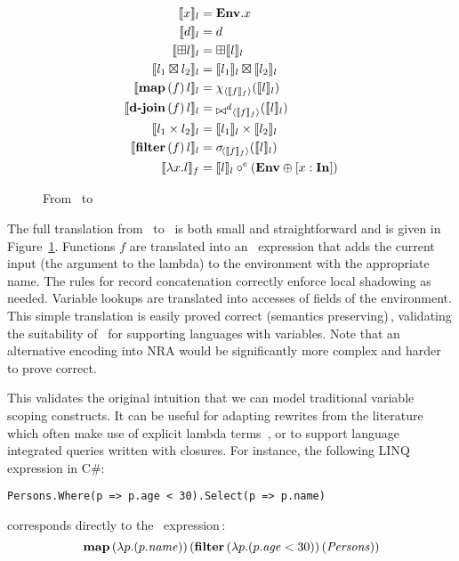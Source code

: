 \begin{figure}[thb]
  \centering
\begin{align*}
\ltoe{x}&=\qENV.x\\
\ltoe{d}&=d\\
\ltoe{\opunop l}&=\opunop{\ltoe{l}}\\
\ltoe{l_1 \opbinop l_2}&=\ltoe{l_1}\opbinop \ltoe{l_2}\\
\ltoe{\lmap{f}{l}}&=\qmap{\ftoe{f}}{\ltoe{l}}\\
\ltoe{\ldjoin{f}{l}}&=\qdjoin{\ftoe{f}}{\ltoe{l}}\\
\ltoe{l_1\times l_2}&=\ltoe{l_1}\times\ltoe{l_2}\\
\ltoe{\lsel{f}{l}}&=\qselect{\ftoe{f}}{\ltoe{l}}\\
\ftoe{\lambda x. l}&=\ltoe{l}\circ^{e}\left(\qENV\opconcat \mbox{[}x : \qID\mbox{]}\right)
\end{align*}
\caption{From \NRALambda\ to
    \NRAEnv\, 
    }
  \label{fig:nralambda-tonraenv}
\end{figure}

The full translation from \NRALambda\ to \NRAEnv\ is both small and
straightforward and is given in Figure~\ref{fig:nralambda-tonraenv}.
Functions $f$ are translated into an \NRAEnv\ expression that adds the
current input (the argument to the lambda) to the environment with the
appropriate name.  The rules for record concatenation correctly
enforce local shadowing as needed.  Variable lookups are translated
into accesses of fields of the environment.  This simple translation
is easily proved correct (semantics
preserving)\,,
validating the suitability of \NRAEnv\ for supporting languages with
variables. Note that an alternative encoding into NRA would be
significantly more complex and harder to prove correct.

This validates the original intuition that we can model traditional
variable scoping constructs. It can be useful for adapting rewrites
from the literature which often make use of explicit lambda
terms~\cite{CareyDFGRSM91,FegarasMS93,LeungMSVVZ93}, or to support
language integrated queries written with closures. For instance, the
following LINQ~\cite{Meijer11} expression in C\#:
\begin{verbatim}
Persons.Where(p => p.age < 30).Select(p => p.name)
\end{verbatim}
corresponds directly to the \NRALambda\ expression\,:
\[\textup{\textbf{{map}}}\left(\lambda p. (p.\mathit{name})\right)(\textup{\textbf{{filter}}}\left(\lambda p. (p.\mathit{age} < 30)\right)(\mathit{Persons}))\]

